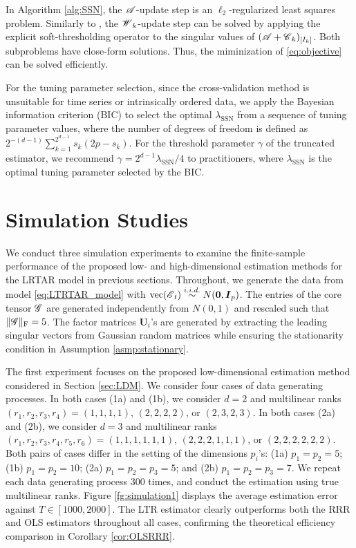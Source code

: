 \documentclass[12pt]{article}
\newcommand{\bm}{\boldsymbol}
\newcommand{\cm}[1]{\mbox{\boldmath$\mathscr{#1}$}}
\begin{document}
In Algorithm \ref{alg:SSN},  the $\cm{A}$-update step is an $\ell_2$-regularized least squares problem. Similarly to \citet{gandy2011tensor}, the $\cm{W}_k$-update step can be solved by applying the explicit  soft-thresholding operator to the singular values of $(\cm{A}+\cm{C}_k)_{[I_k]}$. Both subproblems have close-form solutions. Thus,  the miminization of \eqref{eq:objective} can be solved efficiently. 


For the tuning parameter selection, since the cross-validation method is unsuitable for time series or  intrinsically ordered data, we apply the Bayesian information criterion (BIC)  to select the optimal $\lambda_{\text{SSN}}$ from a sequence of tuning parameter values, where the number of degrees of freedom is defined as $2^{-(d-1)}\sum_{k=1}^{2^{d-1}}s_k(2p-s_k)$. For the threshold parameter $\gamma$ of the truncated estimator, we recommend $\gamma=2^{d-1}\lambda_{\text{SSN}}/4$  to practitioners, where $\lambda_{\text{SSN}}$ is the optimal tuning parameter selected by  the BIC.



\section{Simulation Studies \label{sec:sim}}

We conduct three simulation experiments to examine the finite-sample performance of the proposed low- and high-dimensional estimation methods for the LRTAR model in previous sections. Throughout, we generate the data from model \eqref{eq:LTRTAR_model} with $\text{vec}(\cm{E}_t)\overset{i.i.d.}{\sim}N(\bm{0},\bm{I}_p)$. The entries of the core tensor  $\cm{G}$ are generated independently from $N(0,1)$ and rescaled such that $\|\cm{G}\|_{\text{F}}=5$. The factor matrices $\bm{U}_i$'s are  generated by extracting the leading singular vectors from Gaussian random matrices while ensuring the stationarity condition in Assumption \ref{asmp:stationary}.


The first experiment focuses on the proposed low-dimensional estimation method considered in Section \ref{sec:LDM}. We consider four cases of data generating processes. In both cases (1a) and (1b), we consider $d=2$ and  multilinear ranks $(r_1,r_2,r_3,r_4)=(1,1,1,1)$, $(2,2,2,2)$, or $(2,3,2,3)$. In both cases (2a) and (2b), we consider $d=3$ and  multilinear ranks $(r_1,r_2,r_3,r_4, r_5, r_6)=(1,1,1,1,1,1)$, $(2,2,2,1,1,1)$, or $(2,2,2,2,2,2)$. Both pairs of cases differ in the setting of the dimensions  $p_i$'s: (1a) $p_1=p_2=5$; (1b) $p_1=p_2=10$; (2a) $p_1=p_2=p_3=5$; and (2b) $p_1=p_2=p_3=7$. We repeat each data generating process 300 times, and conduct the estimation using true multilinear ranks. Figure \ref{fg:simulation1} displays the  average estimation error against $T\in[1000,2000]$. The LTR estimator clearly outperforms both the RRR and OLS estimators throughout all cases,  confirming the theoretical efficiency comparison in Corollary \ref{cor:OLSRRR}. 
\end{document}
